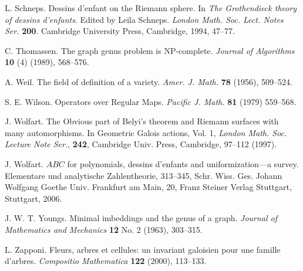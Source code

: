 \documentclass[12pt]{amsart}
\theoremstyle{remark}
\begin{document}
\begin{thebibliography}{99}
L. Schneps.
Dessins d'enfant on the Riemann sphere.
In {\it The Grothendieck theory of dessins d'enfants}. Edited by Leila Schneps. 
{\it London Math. Soc. Lect. Notes Ser.} {\bf 200}. 
Cambridge University Press, Cambridge, 1994, 47--77.

C. Thomassen.
The graph genus problem is NP-complete.
{\it Journal of Algorithms} {\bf 10} (4) (1989), 568--576.

A. Weil.
The field of definition of a variety.
{\it  Amer. J. Math.} {\bf 78} (1956), 509--524.

S. E. Wilson.
Operators over Regular Maps.
{\it Pacific J. Math.} {\bf 81} (1979) 559--568.

J. Wolfart. 
The Obvious part of Belyi's theorem and Riemann surfaces with many automorphisms. In Geometric Galois actions, Vol. 1, {\it London Math. Soc. Lecture Note Ser.}, 
{\bf 242}, Cambridge Univ. Press, Cambridge, 97--112 (1997).

J. Wolfart. 
 $ABC$ for polynomials, dessins d'enfants and uniformization---a survey. Elementare und analytische Zahlentheorie, 313--345, Schr. Wiss. Ges. Johann Wolfgang Goethe Univ. Frankfurt am Main, 20, Franz Steiner Verlag Stuttgart, Stuttgart, 2006.

J. W. T. Youngs.
Minimal imbeddings and the genus of a graph.
{\it Journal of Mathematics and Mechanics} {\bf 12} No. 2 (1963), 303--315.

L. Zapponi.
Fleurs, arbres et cellules: un invariant galoisien pour une famille d'arbres.
{\it Compositio Mathematica} {\bf 122} (2000), 113--133.

\end{thebibliography}
\end{document}
